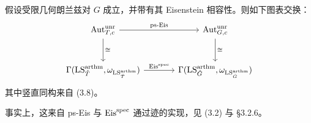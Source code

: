 
\begin{prop}
假设受限几何朗兰兹对 $G$ 成立，并带有其 Eisenstein 相容性。则如下图表交换：
\begin{equation*}
  \begin{tikzcd}[column sep=large, row sep=large]
    \Aut^{\unr}_{T,c} \arrow[r, "\text{ps-Eis}"] \arrow[d, "\cong"]
      & \Aut^{\unr}_{G,c} \arrow[d, "\cong"] \\
    \Gamma(\LS^{\arthm}_{\bT}, \omega_{\LS^{\arthm}_{\bT}}) \arrow[r, "\Eisspec"]
      & \Gamma(\LS^{\arthm}_{\bG}, \omega_{\LS^{\arthm}_{\bG}})
  \end{tikzcd}
\end{equation*}
其中竖直同构来自 (3.8)。
\end{prop}

事实上，这来自 ps-Eis 与 $\mathrm{Eis}^{\mathrm{spec}}$ 通过迹的实现，见 (3.2) 与 §3.2.6。
